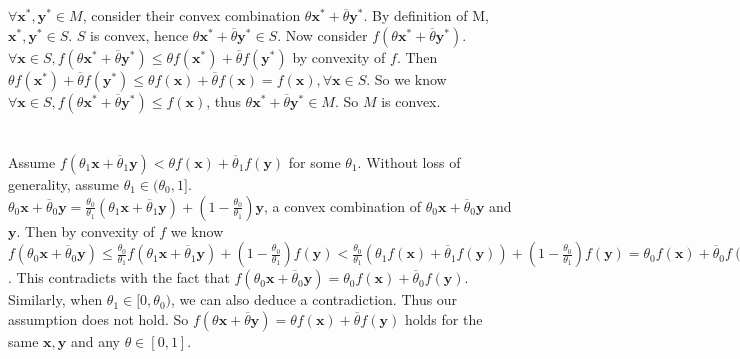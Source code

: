 \documentclass[12pt,letterpaper]{article}
\begin{document}
\section{}
$\forall\boldsymbol{x}^*,\boldsymbol{y}^*\in M$, consider their convex combination $\theta\boldsymbol{x}^*+\overline{\theta}\boldsymbol{y}^*$. By definition of M, $\boldsymbol{x}^*,\boldsymbol{y}^*\in S$. $S$ is convex, hence $\theta\boldsymbol{x}^*+\overline{\theta}\boldsymbol{y}^*\in S$. Now consider $f(\theta\boldsymbol{x}^*+\overline{\theta}\boldsymbol{y}^*)$. $\forall \boldsymbol{x}\in S,f(\theta\boldsymbol{x}^*+\overline{\theta}\boldsymbol{y}^*)\leq\theta f(\boldsymbol{x}^*)+\overline{\theta}f(\boldsymbol{y}^*)$ by convexity of $f$. Then $\theta f(\boldsymbol{x}^*)+\overline{\theta}f(\boldsymbol{y}^*)\leq \theta f(\boldsymbol{x})+\overline{\theta}f(\boldsymbol{x})=f(\boldsymbol{x}),\forall \boldsymbol{x}\in S$. So we know $\forall \boldsymbol{x}\in S,f(\theta\boldsymbol{x}^*+\overline{\theta}\boldsymbol{y}^*)\leq f(\boldsymbol{x})$, thus $\theta\boldsymbol{x}^*+\overline{\theta}\boldsymbol{y}^*\in M$. So $M$ is convex.

\section{}
Assume $f(\theta_1\boldsymbol{x}+\overline{\theta}_1\boldsymbol{y})<\theta f(\boldsymbol{x})+\overline{\theta}_1 f(\boldsymbol{y})$ for some $\theta_1$. Without loss of generality, assume $\theta_1\in(\theta_0,1]$.\\
$\theta_0\boldsymbol{x}+\overline{\theta}_0\boldsymbol{y}=\frac{\theta_0}{\theta_1}(\theta_1\boldsymbol{x}+\overline{\theta}_1\boldsymbol{y})+(1-\frac{\theta_0}{\theta_1})\boldsymbol{y}$, a convex combination of $\theta_0\boldsymbol{x}+\overline{\theta}_0\boldsymbol{y}$ and $\boldsymbol{y}$. Then by convexity of $f$ we know $f(\theta_0\boldsymbol{x}+\overline{\theta}_0\boldsymbol{y})\leq\frac{\theta_0}{\theta_1}f(\theta_1\boldsymbol{x}+\overline{\theta}_1\boldsymbol{y})+(1-\frac{\theta_0}{\theta_1})f(\boldsymbol{y})<\frac{\theta_0}{\theta_1}(\theta_1f(\boldsymbol{x})+\overline{\theta}_1f(\boldsymbol{y}))+(1-\frac{\theta_0}{\theta_1})f(\boldsymbol{y})=\theta_0f(\boldsymbol{x})+\overline{\theta}_0f(\boldsymbol{y})$. This contradicts with the fact that $f(\theta_0\boldsymbol{x}+\overline{\theta}_0\boldsymbol{y})=\theta_0f(\boldsymbol{x})+\overline{\theta}_0f(\boldsymbol{y})$. Similarly, when $\theta_1\in [0,\theta_0)$, we can also deduce a contradiction. Thus our assumption does not hold. So $f(\theta\boldsymbol{x}+\overline{\theta}\boldsymbol{y})=\theta f(\boldsymbol{x})+\overline{\theta}f(\boldsymbol{y})$ holds for the same $\boldsymbol{x},\boldsymbol{y}$ and any $\theta\in[0,1]$.
\end{document}

